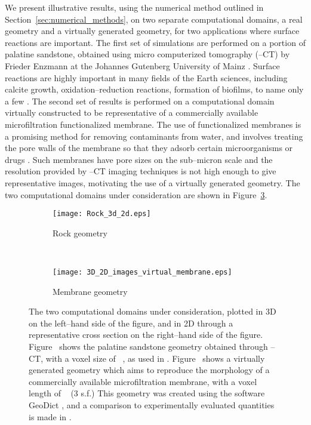 \documentclass[preprint, 1p, authoryear]{elsarticle}
\begin{document}
We present illustrative results, using the numerical method outlined in Section~\ref{sec:numerical_methods}, on  two separate computational domains, a real geometry and a virtually generated geometry, for two applications where surface reactions are important. The first set of  simulations are performed on a portion of  palatine sandstone, obtained using micro computerized tomography (--CT) by Frieder Enzmann at the Johannes Gutenberg University of Mainz  \citep{Becker2011Combining}. Surface reactions are highly important in many 
fields of the Earth sciences, including calcite growth, oxidation--reduction reactions, formation of 
biofilms, to name only a few \citep{Steefel2005Reactive}.  The second set of results is performed  on a
computational domain virtually constructed to be representative of a commercially available microfiltration functionalized membrane. The use of functionalized 
membranes is a promising method for removing contaminants from water, and involves treating the pore walls of the membrane so that they adsorb  certain microorganisms  
or drugs \citep{Ulbricht2006Advanced}.  Such membranes have pore sizes on the sub--micron scale and    the resolution provided by --CT imaging techniques is not high enough to give representative images, motivating the use of a virtually generated  geometry. The two computational domains under consideration are shown in Figure~\ref{fig:Computational_geometries}. 





\begin{figure}
\centering
\begin{subfigure}[c]{0.8\textwidth}
\texttt{[image: Rock\_3d\_2d.eps]} 
\caption{Rock geometry}
\label{fig:Rock_geometry}
\end{subfigure}
\\
\begin{subfigure}[c]{0.8\textwidth}
\texttt{[image: 3D\_2D\_images\_virtual\_membrane.eps]}
\caption{Membrane geometry}
\label{fig:Membrane_geometry}
\end{subfigure}
\caption{The two computational domains under consideration, plotted in 3D on the left--hand side of the figure, and in 2D through a representative cross section on the right--hand side of the figure.  Figure~ shows the  palatine sandstone geometry obtained through --CT,  with a voxel size of ~, as used in \citet{Becker2011Combining}. Figure~ shows a virtually generated geometry which aims to reproduce the morphology of a commercially available microfiltration membrane, with a voxel length of ~ (3 s.f.)  This geometry was created using the software GeoDict \citep{Geodict}, and a comparison to experimentally evaluated quantities is made in \citet{Nicolo2014Virtual}.  }  
\label{fig:Computational_geometries}
\end{figure}
\end{document}
